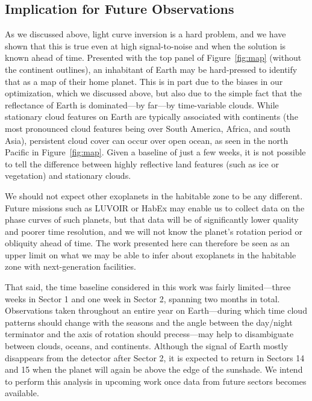 \documentclass[modern]{aastex62}
\begin{document}
\subsection{Implication for Future Observations}
\label{sec:otherplanets}

As we discussed above, light curve inversion is a hard problem,
and we have shown that this is true even at high signal-to-noise and 
when the solution is
known ahead of time. Presented with the top panel of Figure~\ref{fig:map}
(without the continent outlines),
an inhabitant of Earth may be hard-pressed to identify that
as a map of their home planet. This is in part due to the biases
in our optimization, which we discussed above, but also due to the 
simple fact that the reflectance of Earth is dominated---by far---by 
time-variable clouds. While stationary cloud features on Earth are
typically associated with continents (the most pronounced cloud features
being over South America, Africa, and south Asia), persistent cloud
cover can occur over open ocean, as seen in the north Pacific
in Figure~\ref{fig:map}. Given a baseline of just a few weeks, it is
not possible to tell the difference between highly reflective land
features (such as ice or vegetation) and stationary clouds.

We should not expect other exoplanets in the habitable zone to be
any different. Future missions such as LUVOIR or HabEx may enable
us to collect data on the phase curves of such planets, but that
data will be of significantly lower quality and poorer time resolution,
and we will not know the planet's rotation period or obliquity ahead of time.
The work presented here can therefore be seen as an upper limit on what we may
be able to infer about exoplanets in the habitable zone with
next-generation facilities.

That said, the time baseline considered in this work was fairly
limited---three weeks in Sector 1 and one week in Sector 2,
spanning two months in total. Observations taken throughout an entire
year on Earth---during which time cloud patterns should change with the
seasons and the angle between the day/night terminator and the 
axis of rotation should precess---may help to disambiguate between
clouds, oceans, and continents. Although the signal of Earth 
mostly disappears from the \tess detector after Sector 2, it is
expected to return in Sectors 14 and 15 when the planet will again
be above the edge of the sunshade.
We intend to perform this analysis
in upcoming work once data from future \TESS sectors becomes available.
\end{document}
